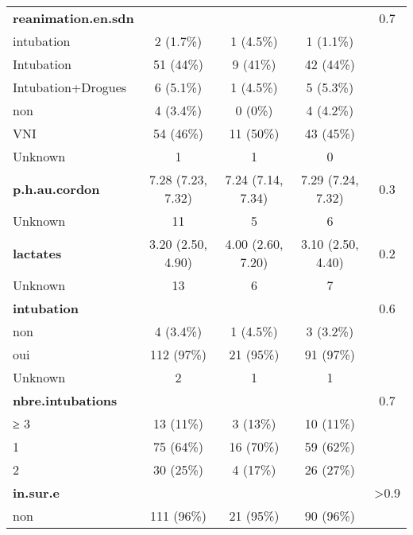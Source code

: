 \documentclass[
  10pt,
  a4paper,
]{scrartcl}
\begin{document}
\begin{longtable}[t]{lcccc}
\textbf{reanimation.en.sdn} &  &  &  & 0.7\\
\hspace{1em}intubation & 2 (1.7\%) & 1 (4.5\%) & 1 (1.1\%) & \\
\hspace{1em}Intubation & 51 (44\%) & 9 (41\%) & 42 (44\%) & \\
\hspace{1em}Intubation+Drogues & 6 (5.1\%) & 1 (4.5\%) & 5 (5.3\%) & \\
\addlinespace
\hspace{1em}non & 4 (3.4\%) & 0 (0\%) & 4 (4.2\%) & \\
\hspace{1em}VNI & 54 (46\%) & 11 (50\%) & 43 (45\%) & \\
\hspace{1em}Unknown & 1 & 1 & 0 & \\
\textbf{p.h.au.cordon} & 7.28 (7.23, 7.32) & 7.24 (7.14, 7.34) & 7.29 (7.24, 7.32) & 0.3\\
\hspace{1em}Unknown & 11 & 5 & 6 & \\
\addlinespace
\textbf{lactates} & 3.20 (2.50, 4.90) & 4.00 (2.60, 7.20) & 3.10 (2.50, 4.40) & 0.2\\
\hspace{1em}Unknown & 13 & 6 & 7 & \\
\textbf{intubation} &  &  &  & 0.6\\
\hspace{1em}non & 4 (3.4\%) & 1 (4.5\%) & 3 (3.2\%) & \\
\hspace{1em}oui & 112 (97\%) & 21 (95\%) & 91 (97\%) & \\
\addlinespace
\hspace{1em}Unknown & 2 & 1 & 1 \vphantom{2} & \\
\textbf{nbre.intubations} &  &  &  & 0.7\\
\hspace{1em}≥ 3 & 13 (11\%) & 3 (13\%) & 10 (11\%) & \\
\hspace{1em}1 & 75 (64\%) & 16 (70\%) & 59 (62\%) & \\
\hspace{1em}2 & 30 (25\%) & 4 (17\%) & 26 (27\%) & \\
\addlinespace
\textbf{in.sur.e} &  &  &  & >0.9\\
\hspace{1em}non & 111 (96\%) & 21 (95\%) & 90 (96\%) & \\

\end{longtable}
\end{document}
